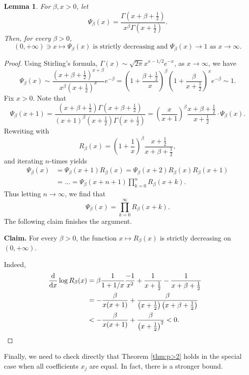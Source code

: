\documentclass[10pt]{article}
\newcommand{\dd}{\mathrm{d}}
\newcommand{\1}{\textbf{1}}
\newtheorem{lemma}[theorem]{Lemma}
\theoremstyle{remark}
\theoremstyle{definition}
\begin{document}
\begin{lemma}\label{lm:special-fun-monot}
For $\beta, x > 0$, let
\[ 
\Psi_\beta(x) = \frac{\Gamma\left(x + \beta + \frac12\right)}{x^\beta\Gamma\left(x+\frac12\right)}.
 \]
Then, for every $\beta > 0$, 
\[
(0, +\infty) \ni x \mapsto \Psi_\beta(x) \text{ is strictly decreasing and }\Psi_\beta(x) \to 1 \text{ as } x \to \infty.
\]
\end{lemma}
\begin{proof}
Using Stirling's formula, $\Gamma(x) \sim \sqrt{2\pi}x^{x-1/2}e^{-x}$, as $x \to \infty$, we have
\[ 
\Psi_\beta(x) \sim \frac{\left(x+\beta+\frac12\right)^{x+\beta}}{x^\beta\left(x+\frac12\right)^x}e^{-\beta} = \left(1 + \frac{\beta+\frac12}{x}\right)^\beta\left(1 + \frac{\beta}{x+\frac12}\right)^xe^{-\beta} \sim 1.
 \]
Fix $x > 0$. Note that
\[ 
\Psi_\beta(x+1) = \frac{\left(x+\beta+\frac12\right)\Gamma\left(x + \beta + \frac12\right)}{(x+1)^\beta\left(x+\frac12\right)\Gamma\left(x+\frac12\right)} = \left(\frac{x}{x+1}\right)^\beta\frac{x+\beta+\frac12}{x+\frac12}\cdot \Psi_\beta(x).
 \]
Rewriting with
\[ 
R_\beta(x) = \left(1+\frac1x\right)^\beta\frac{x+\frac12}{x+\beta+\frac12},
 \]
and iterating  $n$-times yields
\begin{align*}
\Psi_\beta(x) &= \Psi_\beta(x+1)R_\beta(x) = \Psi_\beta(x+2)R_\beta(x)R_\beta(x+1) \\
&= \dots =\Psi_\beta(x+n+1) \prod_{k=0}^n R_\beta(x+k).
 \end{align*}
Thus letting $n \to \infty$, we find that
\[
\Psi_\beta(x) = \prod_{k=0}^\infty R_\beta(x+k).
\]
The following claim finishes the argument.

\textbf{Claim.} For every $\beta > 0$, the function $x \mapsto R_\beta(x)$ is strictly decreasing on $(0,+\infty)$.

Indeed,
\begin{align*}
\frac{\dd}{\dd x}\log R_\beta(x) &= \beta\frac{1}{1+1/x}\frac{-1}{x^2} + \frac{1}{x+\frac12} - \frac{1}{x+\beta + \frac12} \\
&= -\frac{\beta}{x(x+1)} + \frac{\beta}{\left(x+\frac12\right)\left(x+\beta+\frac12\right)} \\
&< -\frac{\beta}{x(x+1)} + \frac{\beta}{\left(x+\frac12\right)^2} < 0.\qquad\qquad\qedhere
 \end{align*}
\end{proof}



Finally, we need to check directly that Theorem \ref{thm:p>2} holds in the special case when all coefficients $x_j$ are equal. In fact, there is a stronger bound.
\end{document}
